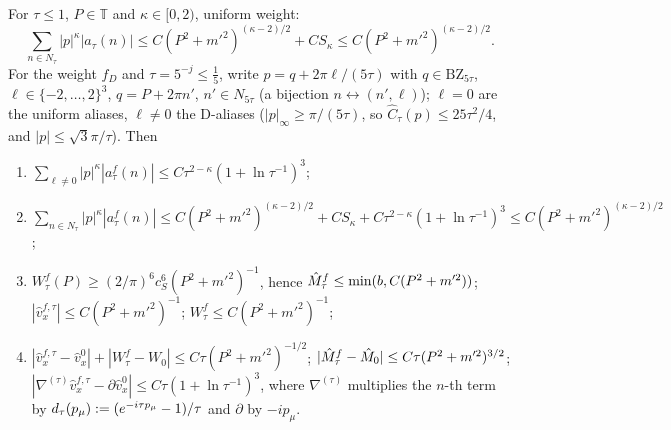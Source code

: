 \begin{lemma}\label{app:a04:lem:Af}
For $\tau\le1$, $P\in\mathbb T$ and $\kappa\in[0,2)$, uniform weight:
\begin{equation}\label{app:a04:eq:star}
\textstyle\sum_{n\in N_\tau}|p|^\kappa|a_\tau(n)|\le C(P^2+m'^2)^{(\kappa-2)/2}+CS_\kappa\le C(P^2+m'^2)^{(\kappa-2)/2}.
\end{equation}
For the weight $f_D$ and $\tau=5^{-j}\le\frac15$, write $p=q+2\pi\ell/(5\tau)$ with $q\in\mathrm{BZ}_{5\tau}$, $\ell\in\{-2,\dots,2\}^3$, $q=P+2\pi n'$, $n'\in N_{5\tau}$ (a bijection $n\leftrightarrow(n',\ell)$); $\ell=0$ are the uniform aliases, $\ell\ne0$ the D-aliases ($|p|_\infty\ge\pi/(5\tau)$, so $\hat C_\tau(p)\le25\tau^2/4$, and $|p|\le\sqrt3\pi/\tau$). Then
\begin{enumerate}[label=\textup{(A\arabic*)},leftmargin=*]
\item $\sum_{\ell\ne0}|p|^\kappa|a^f_\tau(n)|\le C\tau^{2-\kappa}(1+\ln\tau^{-1})^3$;
\item $\sum_{n\in N_\tau}|p|^\kappa|a^f_\tau(n)|\le C(P^2+m'^2)^{(\kappa-2)/2}+CS_\kappa+C\tau^{2-\kappa}(1+\ln\tau^{-1})^3\le C(P^2+m'^2)^{(\kappa-2)/2}$;
\item $W^f_\tau(P)\ge(2/\pi)^6c_S^6(P^2+m'^2)^{-1}$, hence $\hat M^f_\tau\le\min(b,C(P^2+m'^2))$; $|\hat v^{f,\tau}_x|\le C(P^2+m'^2)^{-1}$; $W^f_\tau\le C(P^2+m'^2)^{-1}$;
\item $|\hat v^{f,\tau}_x-\hat v^0_x|+|W^f_\tau-W_0|\le C\tau(P^2+m'^2)^{-1/2}$; $|\hat M^f_\tau-\hat M_0|\le C\tau(P^2+m'^2)^{3/2}$; $|\nabla^{(\tau)}\hat v^{f,\tau}_x-\partial\hat v^0_x|\le C\tau(1+\ln\tau^{-1})^3$, where $\nabla^{(\tau)}$ multiplies the $n$-th term by $d_\tau(p_\mu):=(e^{-i\tau p_\mu}-1)/\tau$ and $\partial$ by $-ip_\mu$.
\end{enumerate}
\end{lemma}
